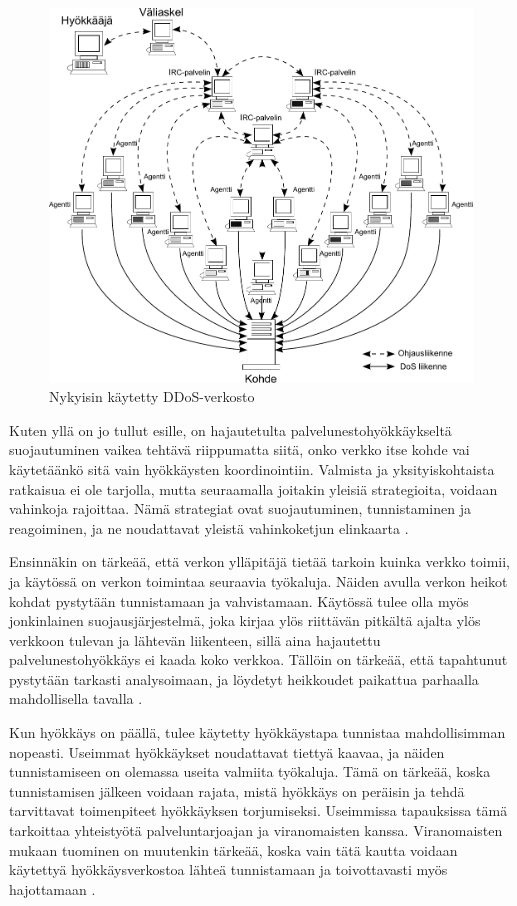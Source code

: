 \begin{figure}[t]
\centering
\includegraphics[width=12cm]{pics/ddos_uusi.pdf}
\caption{Nykyisin käytetty DDoS-verkosto}
\label{ddos2}
\end{figure}

Kuten yllä on jo tullut esille, on hajautetulta palvelunestohyökkäykseltä
suojautuminen vaikea tehtävä riippumatta siitä, onko verkko itse kohde vai
käytetäänkö sitä vain hyökkäysten koordinointiin. Valmista ja yksityiskohtaista
ratkaisua ei ole tarjolla, mutta seuraamalla joitakin yleisiä strategioita,
voidaan vahinkoja rajoittaa. Nämä strategiat ovat suojautuminen, tunnistaminen
ja reagoiminen, ja ne noudattavat yleistä vahinkoketjun elinkaarta \cite{DDOS}.

Ensinnäkin on tärkeää, että verkon ylläpitäjä tietää tarkoin kuinka verkko
toimii, ja käytössä on verkon toimintaa seuraavia työkaluja. Näiden avulla
verkon heikot kohdat pystytään tunnistamaan ja vahvistamaan. Käytössä tulee
olla myös jonkinlainen suojausjärjestelmä, joka kirjaa ylös riittävän pitkältä
ajalta ylös verkkoon tulevan ja lähtevän liikenteen, sillä aina hajautettu
palvelunestohyökkäys ei kaada koko verkkoa. Tällöin on tärkeää, että tapahtunut
pystytään tarkasti analysoimaan, ja löydetyt heikkoudet paikattua parhaalla
mahdollisella tavalla \cite{DDOS}.

Kun hyökkäys on päällä, tulee käytetty hyökkäystapa tunnistaa mahdollisimman
nopeasti. Useimmat hyökkäykset noudattavat tiettyä kaavaa, ja näiden
tunnistamiseen on olemassa useita valmiita työkaluja. Tämä on tärkeää, koska
tunnistamisen jälkeen voidaan rajata, mistä hyökkäys on peräisin ja tehdä
tarvittavat toimenpiteet hyökkäyksen torjumiseksi. Useimmissa tapauksissa
tämä tarkoittaa yhteistyötä palveluntarjoajan ja viranomaisten kanssa.
Viranomaisten mukaan tuominen on muutenkin tärkeää, koska vain tätä kautta
voidaan käytettyä hyökkäysverkostoa lähteä tunnistamaan ja toivottavasti myös
hajottamaan \cite{DDOS}.


